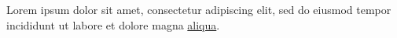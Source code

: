 Lorem ipsum dolor sit amet, consectetur adipiscing elit, sed do eiusmod tempor incididunt ut labore et dolore magna \href{https://example.com}{aliqua}.